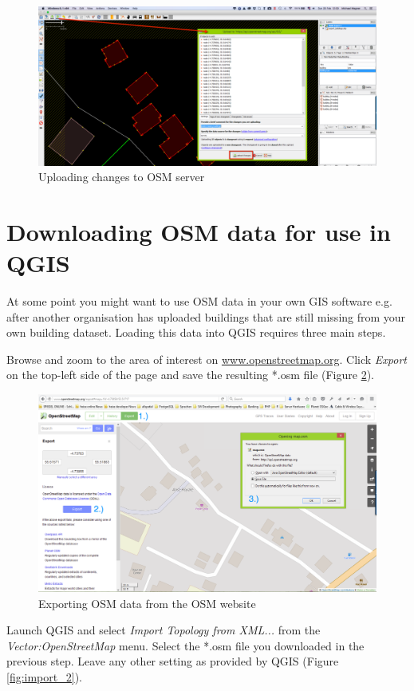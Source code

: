 \documentclass[a4paper,12pt,titlepage]{article}
\begin{document}
\begin{figure}[H]
	\centering
	\includegraphics[width=12cm]{Images/josm_shape_5.png}
	\caption{Uploading changes to OSM server}\label{fig:josm_shape_5}
\end{figure}

\section{Downloading OSM data for use in QGIS}

At some point you might want to use OSM data in your own GIS software e.g. after another organisation has uploaded buildings that are still missing from your own building dataset. Loading this data into QGIS requires three main steps.

Browse and zoom to the area of interest on \url{www.openstreetmap.org}. Click \textit{Export} on the top-left side of the page and save the resulting *.osm file (Figure \ref{fig:import_1}).

\begin{figure}[H]
	\centering
	\includegraphics[width=12cm]{Images/import_1.png}
	\caption{Exporting OSM data from the OSM website}\label{fig:import_1}
\end{figure}

Launch QGIS and select \textit{Import Topology from XML...} from the \textit{Vector:OpenStreetMap} menu. Select the *.osm file you downloaded in the previous step.
Leave any other setting as provided by QGIS (Figure \ref{fig:import_2}).
\end{document}
